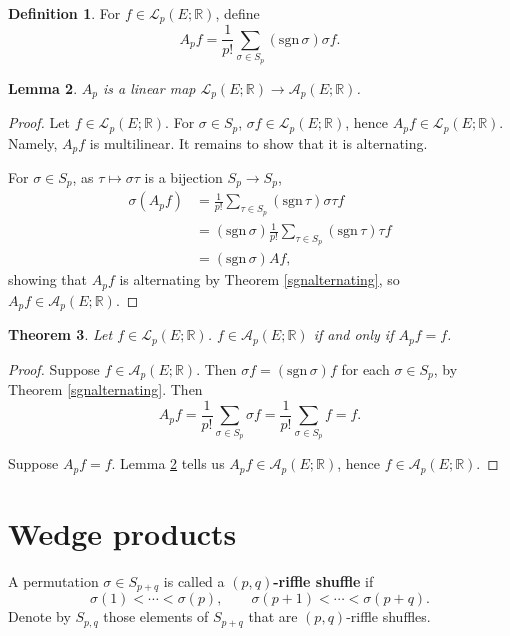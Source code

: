\documentclass{article}
\newcommand{\sgn}{\mathrm{sgn}\,}
\newtheorem{theorem}{Theorem}
\newtheorem{lemma}[theorem]{Lemma}
\theoremstyle{definition}
\newtheorem{definition}[theorem]{Definition}
\begin{document}
\begin{definition}
For $f \in \mathscr{L}_p(E;\mathbb{R})$, define
\[
A_p f = \frac{1}{p!} \sum_{\sigma \in S_p} (\sgn \sigma) \sigma f.
\]
\end{definition}

\begin{lemma}
$A_p$ is a linear map $\mathscr{L}_p(E;\mathbb{R}) \to \mathscr{A}_p(E;\mathbb{R})$.
\label{Aplemma}
\end{lemma}
\begin{proof}
Let $f \in \mathscr{L}_p(E;\mathbb{R})$.  For $\sigma \in S_p$, $\sigma f \in \mathscr{L}_p(E;\mathbb{R})$, hence
$A_p f \in \mathscr{L}_p(E;\mathbb{R})$. Namely, $A_pf$ is multilinear. It remains to show that it is alternating.


For $\sigma \in S_p$, as $\tau \mapsto \sigma \tau$ is a bijection $S_p \to S_p$,
\begin{align*}
\sigma (A_pf) &=  \frac{1}{p!}\sum_{\tau \in S_p} (\sgn \tau) \sigma \tau f\\
&=(\sgn \sigma)  \frac{1}{p!} \sum_{\tau \in S_p} (\sgn \tau) \tau f\\
&=(\sgn \sigma) Af,
\end{align*}
showing that $A_pf$ is alternating by Theorem \ref{sgnalternating}, so $A_pf \in \mathscr{A}_p(E;\mathbb{R})$. 
\end{proof}


\begin{theorem}
Let $f \in \mathscr{L}_p(E;\mathbb{R})$. $f \in \mathscr{A}_p(E;\mathbb{R})$ if and only if $A_pf=f$.
\label{Aproj}
\end{theorem}
\begin{proof}
Suppose $f \in  \mathscr{A}_p(E;\mathbb{R})$. Then $\sigma f  = (\sgn \sigma) f$ for each $\sigma \in S_p$, by Theorem \ref{sgnalternating}.
Then
\[
A_p f = \frac{1}{p!} \sum_{\sigma \in S_p} \sigma f = \frac{1}{p!} \sum_{\sigma \in S_p} f = f.
\]

Suppose $A_pf =f$. Lemma \ref{Aplemma} tells us $A_pf \in \mathscr{A}_p(E;\mathbb{R})$, hence $f \in \mathscr{A}_p(E;\mathbb{R})$.
\end{proof}



\section{Wedge products}
A permutation $\sigma \in S_{p+q}$ is called a \textbf{$(p,q)$-riffle shuffle} if 
\[
\sigma(1)<\cdots<\sigma(p),\qquad \sigma(p+1)<\cdots<\sigma(p+q).
\]
Denote by $S_{p,q}$ those elements of $S_{p+q}$ that are $(p,q)$-riffle shuffles.
\end{document}
